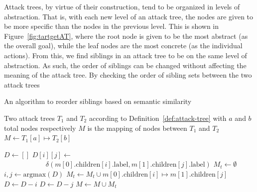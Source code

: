 Attack trees, by virtue of their construction, tend to be organized in levels of abstraction. That is, with each new level of an attack tree, the nodes are given to be more specific than the nodes in the previous level. This is shown in Figure~\ref{fig:tartgetAT}, where the root node is given to be the most abstract (as the overall goal), while the leaf nodes are the most concrete (as the individual actions). From this, we find siblings in an attack tree to be on the same level of abstraction. As such, the order of siblings can be changed without affecting the meaning of the attack tree. By checking the order of sibling sets between the two attack trees

\begin{algorithm}
    \caption{An algorithm to reorder siblings based on semantic similarity}
    \label{alg:sibling_reorder}
    \begin{algorithmic}
        \State Two attack trees $T_1$ and $T_2$ according to Definition~\ref{def:attack-tree} with $a$ and $b$ total nodes respectively
        \State $M$ is the mapping of nodes between $T_1$ and $T_2$ 
        \State $M \gets T_1[a]\mapsto T_2[b]$

        \State $D \gets []$ 
        \State $D[i][j] \gets$
        \State$\text{  }\text{  }\text{  }\text{  }\text{  }\text{  }\text{  }\text{  }\text{  }\delta(m[0].\text{children}[i].\text{label}, m[1].\text{children}[j].\text{label})$
        \EndFor
        \EndFor
        \State $M_t \gets \emptyset$ 
        \State $i, j \gets \text{argmax}(D)$ 
        \State $M_t \gets M_t \cup m[0].\text{children}[i]\mapsto m[1].\text{children}[j]$
        \State $D \gets D - i$ 
        \State $D \gets D - j$ 
        \EndWhile
        \EndIf
        \EndFor
        \State $M \gets M \cup M_t$
        \EndFor
    \end{algorithmic}
\end{algorithm}





